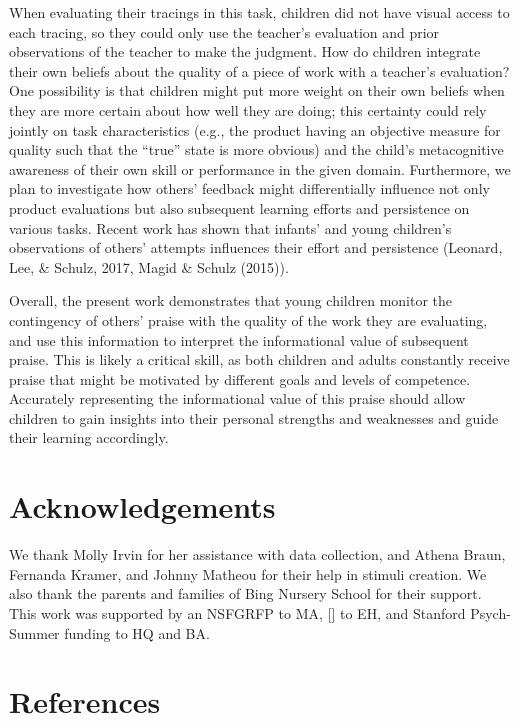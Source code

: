 \documentclass[10pt, letterpaper]{article}
\begin{document}
When evaluating their tracings in this task, children did not have
visual access to each tracing, so they could only use the teacher's
evaluation and prior observations of the teacher to make the judgment.
How do children integrate their own beliefs about the quality of a piece
of work with a teacher's evaluation? One possibility is that children
might put more weight on their own beliefs when they are more certain
about how well they are doing; this certainty could rely jointly on task
characteristics (e.g., the product having an objective measure for
quality such that the ``true'' state is more obvious) and the child's
metacognitive awareness of their own skill or performance in the given
domain. Furthermore, we plan to investigate how others' feedback might
differentially influence not only product evaluations but also
subsequent learning efforts and persistence on various tasks. Recent
work has shown that infants' and young children's observations of
others' attempts influences their effort and persistence (Leonard, Lee,
\& Schulz, 2017, Magid \& Schulz (2015)).

Overall, the present work demonstrates that young children monitor the
contingency of others' praise with the quality of the work they are
evaluating, and use this information to interpret the informational
value of subsequent praise. This is likely a critical skill, as both
children and adults constantly receive praise that might be motivated by
different goals and levels of competence. Accurately representing the
informational value of this praise should allow children to gain
insights into their personal strengths and weaknesses and guide their
learning accordingly.

\section{Acknowledgements}\label{acknowledgements}

We thank Molly Irvin for her assistance with data collection, and Athena
Braun, Fernanda Kramer, and Johnny Matheou for their help in stimuli
creation. We also thank the parents and families of Bing Nursery School
for their support. This work was supported by an NSFGRFP to MA, {[}{]}
to EH, and Stanford Psych-Summer funding to HQ and BA.

\section{References}\label{references}
\end{document}
